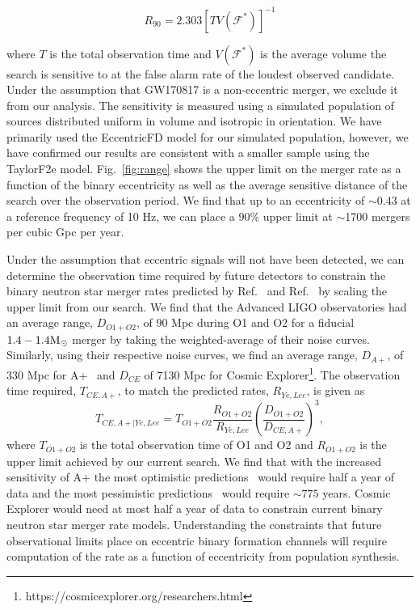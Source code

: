 \begin{equation}
    R_{90} = 2.303 \left[TV(\mathcal{F}^*)\right]^{-1}
\end{equation}

where $T$ is the total observation time and $V(\mathcal{F^*})$ is the average volume the search is sensitive to at the false alarm rate of the loudest observed candidate. Under the assumption that GW170817 is a non-eccentric merger, we exclude it from our analysis. The sensitivity is measured using a simulated population of sources distributed uniform in volume and isotropic in orientation. We have primarily used the EccentricFD model for our simulated population, however, we have confirmed our results are consistent with a smaller sample using the TaylorF2e model. Fig.~\ref{fig:range} shows the upper limit on the merger rate as a function of the binary eccentricity as well as the average sensitive distance of the search over the observation period. We find that up to an eccentricity of $\sim 0.43$ at a reference frequency of 10 Hz, we can place a $90\%$ upper limit at $\sim$1700 mergers per cubic Gpc per year.

Under the assumption that eccentric signals will not have been detected, we can determine the observation time required by future detectors to constrain the binary neutron star merger rates predicted by Ref.~\cite{Lee:2009ca} and Ref.~\cite{Ye:2019xvf} by scaling the upper limit from our search. We find that the Advanced LIGO observatories had an average range, $D_{O1+O2}$, of 90 Mpc during O1 and O2 for a fiducial $1.4-1.4 \mathrm{M}_{\odot}$ merger by taking the weighted-average of their noise curves. Similarly, using their respective noise curves, we find an average range, $D_{A+}$, of 330 Mpc for A+~\cite{Aasi:2013wya} and $D_{CE}$ of 7130 Mpc for Cosmic Explorer\footnote{https://cosmicexplorer.org/researchers.html}. The observation time required, $T_{CE,A+}$, to match the predicted rates, $R_{Ye, Lee}$, is given as
\begin{equation}
    T_{CE,A+|Ye,Lee} = T_{O1+O2} \frac{R_{O1+O2}}{R_{Ye,Lee}} \left(\frac{D_{O1+O2}}{ D_{CE,A+}}\right)^3,
\end{equation}
where $T_{O1+O2}$ is the total observation time of O1 and O2 and $R_{O1+O2}$ is the upper limit achieved by our current search. We find that with the increased sensitivity of A+ the most optimistic predictions~\cite{Lee:2009ca} would require half a year of data and the most pessimistic predictions~\cite{Ye:2019xvf} would require $\sim 775$ years. Cosmic Explorer would need at most half a year of data to constrain current binary neutron star merger rate models. Understanding the constraints that future observational limits place on eccentric binary formation channels will require computation of the rate as a function of eccentricity from population synthesis.

